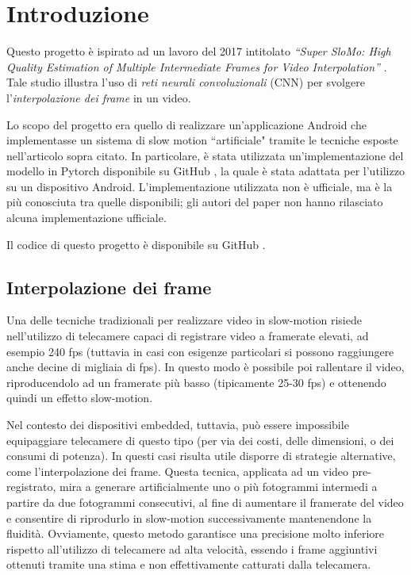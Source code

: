 \chapter*{Introduzione}

Questo progetto è ispirato ad un lavoro del 2017 intitolato 
\textit{``Super SloMo: High Quality Estimation of Multiple Intermediate Frames for Video Interpolation''} \cite{paper_superslomo}.
Tale studio illustra l'uso di \textit{reti neurali convoluzionali} (CNN) per svolgere l'\textit{interpolazione dei frame} 
in un video.

Lo scopo del progetto era quello di realizzare un'applicazione Android che implementasse un sistema di slow motion 
``artificiale" tramite le tecniche esposte nell'articolo sopra citato. In particolare, è stata utilizzata 
un'implementazione del modello in Pytorch disponibile su GitHub \cite{git_superslowmo}, la quale è stata adattata per l'utilizzo su un 
dispositivo Android. L'implementazione utilizzata non è ufficiale, ma è la più conosciuta tra quelle disponibili; gli autori del
paper non hanno rilasciato alcuna implementazione ufficiale.

Il codice di questo progetto è disponibile su GitHub \cite{git_progetto}.

\section*{Interpolazione dei frame}

Una delle tecniche tradizionali per realizzare video in slow-motion risiede nell'utilizzo di telecamere capaci di 
registrare video a framerate elevati, ad esempio 240 fps (tuttavia in casi con esigenze particolari si possono 
raggiungere anche decine di migliaia di fps). In questo modo è possibile poi rallentare il video, riproducendolo ad 
un framerate più basso (tipicamente 25-30 fps) e ottenendo quindi un effetto slow-motion.

Nel contesto dei dispositivi embedded, tuttavia, può essere impossibile equipaggiare telecamere di questo tipo (per via
dei costi, delle dimensioni, o dei consumi di potenza). In questi casi risulta utile disporre di strategie alternative, come l'interpolazione dei 
frame. Questa tecnica, applicata ad un video pre-registrato, mira a generare artificialmente uno o più fotogrammi intermedi 
a partire da due fotogrammi consecutivi, al fine di aumentare il framerate del video e consentire di riprodurlo in slow-motion
successivamente mantenendone la fluidità. Ovviamente, questo metodo garantisce una precisione molto inferiore rispetto
all'utilizzo di telecamere ad alta velocità, essendo i frame aggiuntivi ottenuti tramite una stima e non effettivamente
catturati dalla telecamera.

